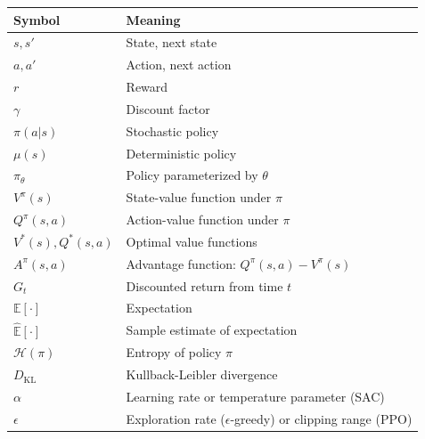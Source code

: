 \documentclass[11pt,a4paper,openany]{book}
\theoremstyle{definition}
\theoremstyle{remark}
\begin{document}
\begin{tabular}{ll}
\toprule
\textbf{Symbol} & \textbf{Meaning} \\
\midrule
$s, s'$ & State, next state \\
$a, a'$ & Action, next action \\
$r$ & Reward \\
$\gamma$ & Discount factor \\
$\pi(a|s)$ & Stochastic policy \\
$\mu(s)$ & Deterministic policy \\
$\pi_\theta$ & Policy parameterized by $\theta$ \\
$V^{\pi}(s)$ & State-value function under $\pi$ \\
$Q^{\pi}(s,a)$ & Action-value function under $\pi$ \\
$V^{\ast}(s), Q^{\ast}(s,a)$ & Optimal value functions \\
$A^{\pi}(s,a)$ & Advantage function: $Q^{\pi}(s,a) - V^{\pi}(s)$ \\
$G_t$ & Discounted return from time $t$ \\
$\mathbb{E}[\cdot]$ & Expectation \\
$\hat{\mathbb{E}}[\cdot]$ & Sample estimate of expectation \\
$\mathcal{H}(\pi)$ & Entropy of policy $\pi$ \\
$D_{\mathrm{KL}}$ & Kullback-Leibler divergence \\
$\alpha$ & Learning rate or temperature parameter (SAC) \\
$\epsilon$ & Exploration rate ($\epsilon$-greedy) or clipping range (PPO) \\
\bottomrule
\end{tabular}
\end{document}
